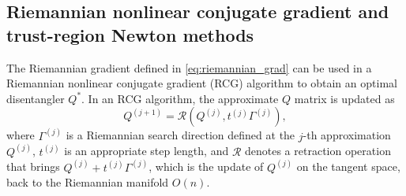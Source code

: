\documentclass[pdflatex,sn-mathphys-num]{sn-jnl}
\newcounter{thm}[section]
\begin{document}
\subsection{Riemannian nonlinear conjugate gradient and trust-region Newton methods}
The Riemannian gradient defined in \eqref{eq:riemannian_grad} can be used in a Riemannian nonlinear conjugate gradient (RCG) algorithm to obtain an optimal disentangler $Q^*$.  In an RCG algorithm, the approximate $Q$ matrix is updated as
\begin{equation}
Q^{(j+1)} = \mathcal{R}(Q^{(j)},t^{(j)} \Gamma^{(j)}),
\end{equation}
where $\Gamma^{(j)}$ is a Riemannian search direction defined at the $j$-th approximation $Q^{(j)}$, $t^{(j)}$ is an appropriate step length, and $\mathcal{R}$ denotes a retraction operation that brings $Q^{(j)} + t^{(j)}\Gamma^{(j)}$, which is the update of $Q^{(j)}$ on the tangent space, back to the Riemannian manifold $O(n)$.
\end{document}
